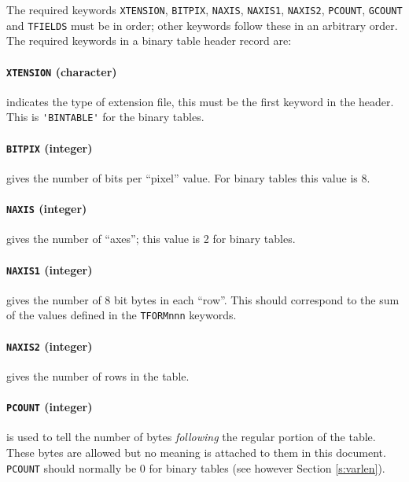       The required keywords {\tt XTENSION}, {\tt BITPIX}, 
{\tt NAXIS}, {\tt NAXIS1}, {\tt NAXIS2}, {\tt PCOUNT}, {\tt GCOUNT}
and {\tt TFIELDS} must be in order; other keywords follow these in an
arbitrary
order.  The required keywords
in a binary table header record
are:

\paragraph{{\tt XTENSION} (character)} indicates the
type 
of extension file, this must be the first keyword in the header.  
This is \verb*+'BINTABLE'+ for the binary tables.

\paragraph{{\tt BITPIX} (integer)} gives the number of 
bits per ``pixel'' value.  For binary tables this value is 8.

\paragraph{{\tt NAXIS} (integer)} gives the number of
``axes''; 
this value is 2 for binary tables.

\paragraph{{\tt NAXIS1} (integer)} gives 
the number of 8 bit bytes in each ``row''.
This should correspond to the sum of the values defined in the
{\tt TFORMnnn} keywords.

\paragraph{{\tt NAXIS2} (integer)} gives
 the number of rows in the table.

\paragraph{{\tt PCOUNT} (integer)} is used
to tell the number of bytes 
{\it following} the regular portion of the table.  These bytes are allowed
but no meaning is attached to them in this document.
{\tt PCOUNT} should normally be 0 for binary 
tables (see however Section \ref{s:varlen}).

